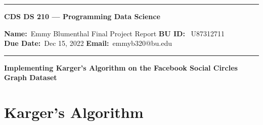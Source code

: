 \documentclass[10pt]{article}
\newcommand{\1}{\mathbf 1}
\begin{document}
\begin{center}
	\hrule
	\vspace{.4cm}
	{\textbf { \large CDS DS 210 --- Programming Data Science}}
\end{center}
{\textbf{Name:}\ Emmy Blumenthal \hspace{\fill} Final Project Report\hspace{\fill}  \textbf{BU ID:} \ U87312711 \\
\textbf{Due Date:}\  Dec 15, 2022   \hspace{\fill} \textbf{Email:}\ emmyb320@bu.edu \ 
\vspace{.4cm}
\hrule

\begin{center}
	\Large 
	{
	\bf
	Implementing Karger's Algorithm on the Facebook Social Circles Graph Dataset
	}
\end{center}
\section*{Karger's Algorithm}



}
\end{document}
